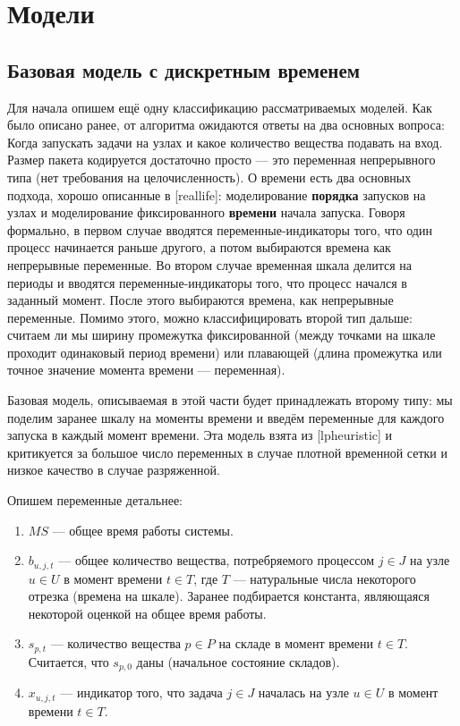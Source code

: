 \documentclass[12pt, twoside]{article}
\theoremstyle{definition}
\begin{document}
\section{Модели}
\subsection{Базовая модель с дискретным временем}

Для начала опишем ещё одну классификацию рассматриваемых моделей. Как было описано ранее, от алгоритма ожидаются ответы на два основных вопроса: Когда запускать задачи на узлах и какое количество вещества подавать на вход. Размер пакета кодируется достаточно просто --- это переменная непрерывного типа (нет требования на целочисленность). О времени есть два основных подхода, хорошо описанные в [reallife]: моделирование \textbf{порядка} запусков на узлах и моделирование фиксированного \textbf{времени} начала запуска. Говоря формально, в первом случае вводятся переменные-индикаторы того, что один процесс начинается раньше другого, а потом выбираются времена как непрерывные переменные. Во втором случае временная шкала делится на периоды и вводятся переменные-индикаторы того, что процесс начался в заданный момент. После этого выбираются времена, как непрерывные переменные. Помимо этого, можно классифицировать второй тип дальше: считаем ли мы ширину промежутка фиксированной (между точками на шкале проходит одинаковый период времени) или плавающей (длина промежутка или точное значение момента времени --- переменная).

Базовая модель, описываемая в этой части будет принадлежать второму типу: мы поделим заранее шкалу на моменты времени и введём переменные для каждого запуска в каждый момент времени. Эта модель взята из [lpheuristic] и критикуется за большое число переменных в случае плотной временной сетки и низкое качество в случае разряженной.

Опишем переменные детальнее: 

\begin{enumerate}

\item $MS$ --- общее время работы системы.
\item $b_{u,j,t}$ --- общее количество вещества, потребряемого процессом $j \in J$ на узле $u \in U$ в момент времени $t \in T$, где $T$ --- натуральные числа некоторого отрезка (времена на шкале). Заранее подбирается константа, являющаяся некоторой оценкой на общее время работы.
\item $s_{p, t}$ --- количество вещества $p \in P$ на складе в момент времени $t \in T$. Считается, что $s_{p, 0}$ даны (начальное состояние складов).
\item $x_{u, j, t}$ --- индикатор того, что задача $j \in J$ началась на узле $u \in U$ в момент времени $t \in T$.

\end{enumerate}
\end{document}
